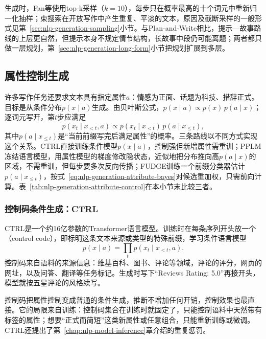 生成时，Fan等使用top-k采样（$k=10$），每步只在概率最高的十个词元中重新归一化抽样；束搜索在开放写作中产生重复、平淡的文本，原因及截断采样的一般形式见第~\ref{sec:nlp-generation-sampling}小节。与Plan-and-Write相比，提示—故事路线的上层更自然，但提示本身不规定情节结构，长故事中段仍可能离题；两者都只做一层规划，第~\ref{sec:nlp-generation-long-form}小节把规划扩展到多层。

\subsection{属性控制生成}
\label{sec:nlp-generation-attribute-control}

许多写作任务还要求文本具有指定属性$a$：情感为正面、话题为科技、措辞正式。目标是从条件分布$p(x\mid a)$生成。由贝叶斯公式，$p(x\mid a)\propto p(x)\,p(a\mid x)$；逐词元写开，第$t$步应满足
\begin{equation}
  p(x_t\mid x_{<t},a)\propto p(x_t\mid x_{<t})\,p(a\mid x_{\le t}),
  \label{eq:nlp-generation-attribute-bayes}
\end{equation}
其中$p(a\mid x_{\le t})$是“当前前缀写完后满足属性”的概率。三条路线以不同方式实现这个关系。CTRL直接训练条件模型$p(x\mid a)$，控制强但新增属性需重训；PPLM冻结语言模型，用属性模型的梯度修改隐状态，近似地把分布推向高$p(a\mid x)$的区域，不需重训，但每步要多次反向传播；FUDGE训练一个前缀分类器估计$p(a\mid x_{\le t})$，按式~\eqref{eq:nlp-generation-attribute-bayes}对候选重加权，只需前向计算。表~\ref{tab:nlp-generation-attribute-control}在本小节末比较三者。

\subsubsection{控制码条件生成：CTRL}
\label{sec:nlp-generation-ctrl}

CTRL是一个约16亿参数的Transformer语言模型。训练时在每条序列开头放一个（control code），即标明这条文本来源或类型的特殊前缀，学习条件语言模型
\[
  p(x\mid a)=\prod_{t}p(x_t\mid x_{<t},a).
\]
控制码来自语料的来源信息：维基百科、图书、评论等领域，评论的评分，网页的网址，以及问答、翻译等任务标记。生成时写下“Reviews Rating: 5.0”再接开头，模型就按五星评论的风格续写。

控制码把属性控制变成普通的条件生成，推断不增加任何开销，控制效果也最直接。它的局限来自训练：控制码集合在训练时就固定了，只能控制语料中天然带有标签的属性；想要“正式而简短”这类新属性或任意组合，只能重新训练或微调。CTRL还提出了第~\ref{chap:nlp-model-inference}章介绍的重复惩罚。

